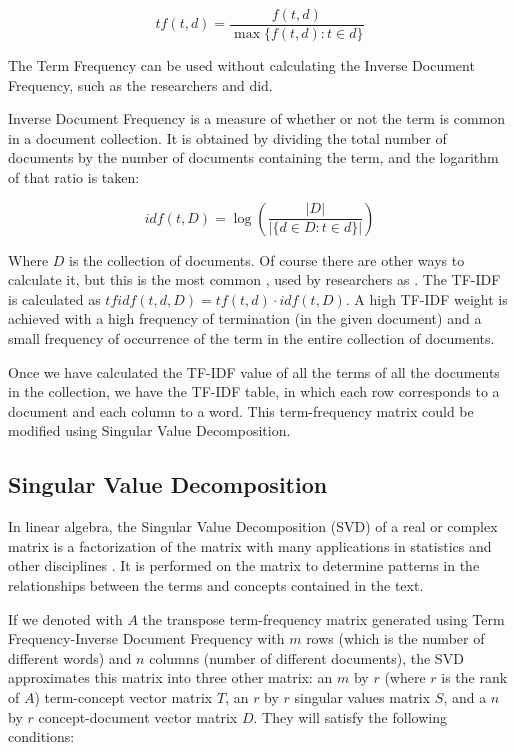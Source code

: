 $$
tf(t,d)=\frac{f(t,d)}{\max\{ f(t,d):t\in d\}}
$$

The Term Frequency can be used without calculating the Inverse Document Frequency, such as the researchers \cite{cohen1996learning} and \cite{segal1999mailcat} did.

Inverse Document Frequency is a measure of whether or not the term is common in a document collection. It is obtained by dividing the total number of documents by the number of documents containing the term, and the logarithm of that ratio is taken:

$$
idf(t,D)=\log\left(\frac{\lvert D\rvert}{\lvert\{ d\in D:t\in d\}\rvert}\right)
$$

Where $D$ is the collection of documents. Of course there are other ways to calculate it, but this is the most common \citep{tang2014email}, used by researchers as \cite{drucker1999support}. The TF-IDF is calculated as $tfidf(t,d,D) = tf(t,d)\cdot idf(t,D)$. A high TF-IDF weight is achieved with a high frequency of termination (in the given document) and a small frequency of occurrence of the term in the entire collection of documents.

Once we have calculated the TF-IDF value of all the terms of all the documents in the collection, we have the TF-IDF table, in which each row corresponds to a document and each column to a word. This term-frequency matrix could be modified using Singular Value Decomposition.

\subsection{Singular Value Decomposition}\label{ssect:svd}

In linear algebra, the Singular Value Decomposition (SVD) of a real or complex matrix is a factorization of the matrix with many applications in statistics and other disciplines \citep{stewart1993early}. It is performed on the matrix to determine patterns in the relationships between the terms and concepts contained in the text.

If we denoted with $A$ the transpose term-frequency matrix generated using Term Frequency-Inverse Document Frequency with $m$ rows (which is the number of different words) and $n$ columns (number of different documents), the SVD approximates this matrix into three other matrix: an $m$ by $r$ (where $r$ is the rank of $A$) term-concept vector matrix $T$, an $r$ by $r$ singular values matrix $S$, and a $n$ by $r$ concept-document vector matrix $D$. They will satisfy the following conditions:


